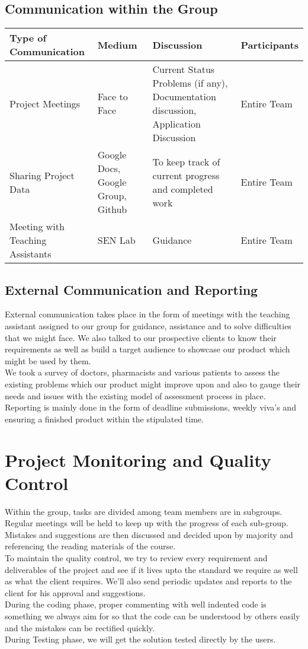 \documentclass[
10pt, %
a4paper, %
oneside, %
headinclude,footinclude, %
BCOR5mm, %
]{scrartcl}
\begin{document}
\subsection{Communication within the Group}
\begin{table}[h!]
\begin{tabular}{| p{3cm}| p{3cm}| p{3cm}| p{3cm}|} 
 \hline
Type of Communication &
Medium & Discussion & Participants\\ [1.5ex] 
 \hline\hline
Project Meetings & Face to Face &
Current Status Problems (if any),  Documentation discussion, Application Discussion& Entire Team\\
\hline
Sharing Project Data &
Google Docs, Google Group, Github &
To keep track of current progress and completed work &
Entire Team\\
\hline 
Meeting with Teaching Assistants & SEN Lab & Guidance & Entire Team \\
\hline
\end{tabular}
\end{table}
\vspace{1.2cm}
\subsection{External Communication and Reporting}

External communication takes place in the form of  meetings with the teaching assistant assigned to our group for guidance, assistance and to solve difficulties that we might face. We also talked to our prospective clients to know their requirements as well as build a target audience to showcase our product which might be used by them.
\\We took a survey of doctors, pharmacists and various patients  to assess the existing problems which our product might improve upon and also to gauge their needs and issues with the existing model of assessment process in place.
\\Reporting is mainly done in the form of deadline submissions, weekly viva’s and ensuring a finished product within the stipulated time.

\section{Project Monitoring and Quality Control}
Within the group, tasks are divided among team members are in subgroups. Regular meetings will be held to keep up with the progress of each sub-group. Mistakes and suggestions are then discussed and decided upon by majority and referencing the reading materials of the course.
\\To maintain the quality control, we try to review every requirement and deliverables of the project and see if it lives upto the standard we require as well as what the client requires. We'll also send periodic updates and reports to the client for his approval and suggestions.
\\During the coding phase, proper commenting with well indented code is something we always aim for so that the code can be understood by others easily and the mistakes can be rectified quickly.
\\During Testing phase, we will get the solution tested directly by the users.
\end{document}
